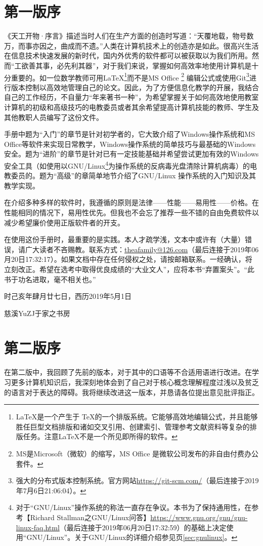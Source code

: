 \chapter{第一版序}
《天工开物·序言》描述当时人们在生产方面的创造时写道：“天覆地载，物号数万，而事亦因之，曲成而不遗。”人类在计算机技术上的创造亦是如此。很高兴生活在信息技术快速发展的新时代，国内外优秀的软件都可以被获取以为我们所用。然而“工欲善其事，必先利其器”，对于我们来说，掌握如何高效率地使用计算机是十分重要的。如一位数学教师可用\LaTeX\footnote{\LaTeX 是一个产生于 \TeX 的一个排版系统。它能够高效地编辑公式，并且能够胜任巨型文档排版和诸如交叉引用、创建索引、管理参考文献资料等复杂的排版任务。注意\LaTeX 不是一个所见即所得的软件。}而不是MS Office \footnote{MS是Microsoft（微软）的缩写，MS Office 是微软公司发布的非自由付费办公套件。} 编辑公式或使用Git\footnote{强大的分布式版本控制系统。官方网站\url{https://git-scm.com/}（最后连接于2019年7月6日21:06:04）。}进行版本控制以高效地管理自己的论文。因此，为了方便信息化教学的开展，我结合自己的工作经历，不自量力“年来著书一种”，为希望掌握关于如何高效地使用教室计算机的初级和高级技巧的电教委员或者其余希望提高计算机技能的教师、学生及其他教职人员编写了这份文件。\par
手册中题为“入门”的章节是针对初学者的，它大致介绍了Windows操作系统和MS Office等软件来实现日常教学，Windows操作系统的简单技巧与最基础的Windows安全。题为“进阶”的章节是针对已有一定技能基础并希望尝试更加有效的Windows安全工具（如使用以GNU/Linux\footnote{对于“GNU/Linux”操作系统的称法一直存在争议。本书为了保持通用性，在参考【Richard Stallman之GNU/Linux问答】\url{https://www.gnu.org/gnu/gnu-linux-faq.html}（最后连接于2019年06月20日17:32:59）的基础上决定使用“GNU/Linux”。关于GNU/Linux的详细介绍参见\pageref{sec:gnulinux}页\ref{sec:gnulinux}。}为操作系统的反病毒光盘清除计算机病毒）的电教委员的。题为“高级”的章简单地节介绍了GNU/Linux 操作系统的入门知识及其教学实现。\par
在介绍多种多样的软件时，我遵循的原则是法律——性能——易用性——价格。在性能相同的情况下，易用性优先。但我也不会忘了推荐一些不错的自由免费软件以减少希望廉价使用正版软件者的开支。\par
在使用这份手册时，最重要的是实践。本人才疏学浅，文本中或许有（大量）错误，请广大读者不吝赐教。联系方式：\url{theafamily@126.com}（最后连接于2019年06月20日17:32:17）。如果文档中存在任何侵权之处，请按邮箱联系。一经确认，将立刻改正。希望在选考中取得优良成绩的“大业文人”，应将本书“弃置案头”。“此书于功名进取，毫不相关也。”\par
时己亥年肆月廿七日，西历2019年5月1日\par
慈溪YuZJ于家之书房
\chapter{第二版序}
在第二版中，我回顾了先前的版本，对于其中的口语等不合适用语进行改进。在学习更多计算机知识后，我深刻地体会到了自己对于核心概念理解程度过浅以及贫乏的语言对于表达的障碍。我将继续改进这一版本，并恳请各位提出意见批评指正。
